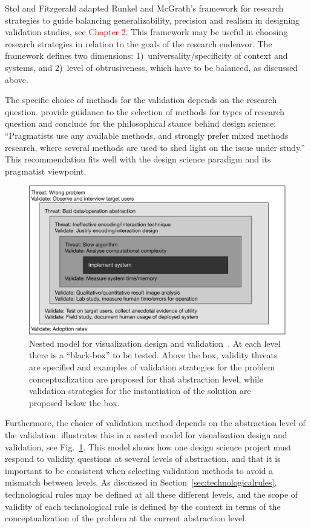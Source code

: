 \documentclass[graybox]{svmult}
\begin{document}
Stol and Fitzgerald adapted Runkel and McGrath's framework for research strategies to guide balancing generalizability, precision and realism in designing validation studies, see \textcolor{red}{Chapter 2}. This framework may be useful in choosing research strategies in relation to the goals of the research endeavor. The framework defines two dimensions: 1)~universality/specificity of context and systems, and 2)~level of obtrusiveness, which have to be balanced, as discussed above. 

The specific choice of methods for the validation depends on the research question. \cite{easterbrook_selecting_2008}  provide guidance to the selection of methods for types of research question and conclude for the philosophical stance behind design science: ``Pragmatists use any available methods, and strongly prefer mixed methods research, where several methods are used to shed light on the issue under study.''
This recommendation fits well with the design science paradigm and its pragmatist viewpoint.

\begin{figure}[t]
  \includegraphics[width=\textwidth]{Figures/nested_model.pdf}
\caption{Nested model for visualization design and validation~\citep{munzner2009}. At each level there is a ``black-box'' to be tested. Above the box, validity threats are specified and examples of validation strategies for the problem conceptualization are proposed for that abstraction level, while validation strategies for the instantiation of the solution are proposed below the box.}\label{fig:nested_model}       
\end{figure} 

Furthermore, the choice of validation method depends on the abstraction level of the validation. \cite{munzner2009} illustrates this in a nested model for visualization design and validation, see Fig.~\ref{fig:nested_model}. This model shows how one design science project must respond to validity questions at several levels of abstraction, and that it is important to be consistent when selecting validation methods to avoid a mismatch between levels. As discussed in Section~\ref{sec:technologicalrules}, technological rules may be defined at all these different levels, and the scope of validity of each technological rule is defined by the context in terms of the conceptualization of the problem at the current abstraction level.
\end{document}
